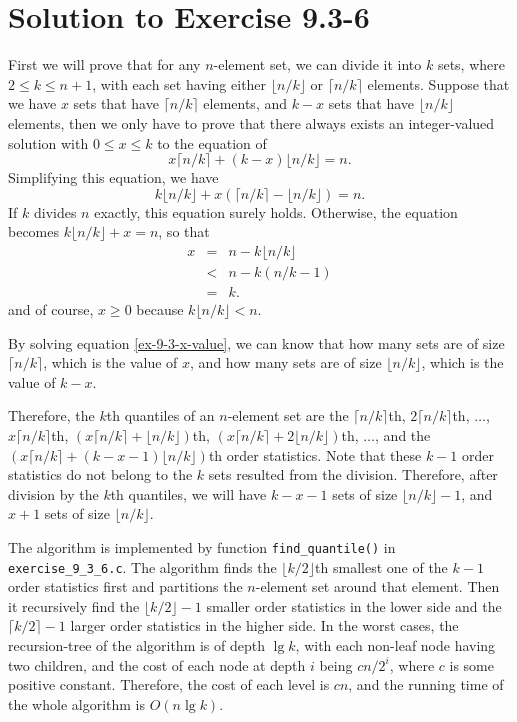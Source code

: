\documentclass[a4paper, fleqn]{article}
\begin{document}
\section*{Solution to Exercise 9.3-6}

First we will prove that for any $n$-element set, we can divide it
into $k$ sets, where $2 \leq k \leq n + 1$, with each set having
either $\lfloor n / k \rfloor$ or $\lceil n / k \rceil$
elements. Suppose that we have $x$ sets that have $\lceil n / k
\rceil$ elements, and $k - x$ sets that have $\lfloor n / k \rfloor$
elements, then we only have to prove that there always exists an
integer-valued solution with $0 \leq x \leq k$ to the equation of
\[
x\lceil n / k \rceil + (k - x) \lfloor n / k \rfloor = n.
\]
Simplifying this equation, we have
\[
k\lfloor n / k \rfloor + x (\lceil n / k \rceil - \lfloor n / k \rfloor) = n.
\]
If $k$ divides $n$ exactly, this equation surely holds. Otherwise, the
equation becomes $k \lfloor n / k \rfloor + x = n$, so that
\begin{eqnarray}
\label{ex-9-3-x-value}
x & = & n - k\lfloor n / k \rfloor \\
\nonumber
  & < & n - k(n / k - 1) \\
\nonumber
  & = & k.
\end{eqnarray}
and of course, $x \geq 0$ because $k\lfloor n / k \rfloor < n$.

By solving equation \ref{ex-9-3-x-value}, we can know that how many
sets are of size $\lceil n / k \rceil$, which is the value of $x$,
and how many sets are of size $\lfloor n / k \rfloor$, which is the
value of $k - x$.

Therefore, the $k$th quantiles of an $n$-element set are the $\lceil n
/ k \rceil$th, $2\lceil n / k \rceil$th, $\ldots$, $x\lceil n / k
\rceil$th, $(x\lceil n / k \rceil + \lfloor n / k \rfloor)$th,
$(x\lceil n / k \rceil + 2\lfloor n / k \rfloor)$th, $\ldots$, and the
$(x\lceil n / k \rceil + (k - x - 1)\lfloor n / k \rfloor)$th order
statistics. Note that these $k - 1$ order statistics do not belong to
the $k$ sets resulted from the division. Therefore, after division by
the $k$th quantiles, we will have $k - x - 1$ sets of size $\lfloor n
/ k \rfloor - 1$, and $x + 1$ sets of size $\lfloor n / k \rfloor$.

The algorithm is implemented by function \texttt{find\_quantile()} in
\texttt{exercise\_9\_3\_6.c}. The algorithm finds the $\lfloor k / 2
\rfloor$th smallest one of the $k - 1$ order statistics first and
partitions the $n$-element set around that element. Then it
recursively find the $\lfloor k / 2 \rfloor - 1$ smaller order
statistics in the lower side and the $\lceil k / 2 \rceil - 1$ larger
order statistics in the higher side. In the worst cases, the
recursion-tree of the algorithm is of depth $\lg k$, with each
non-leaf node having two children, and the cost of each node at depth
$i$ being $cn / 2^i$, where $c$ is some positive constant. Therefore,
the cost of each level is $cn$, and the running time of the whole
algorithm is $O(n \lg k)$.
\end{document}
